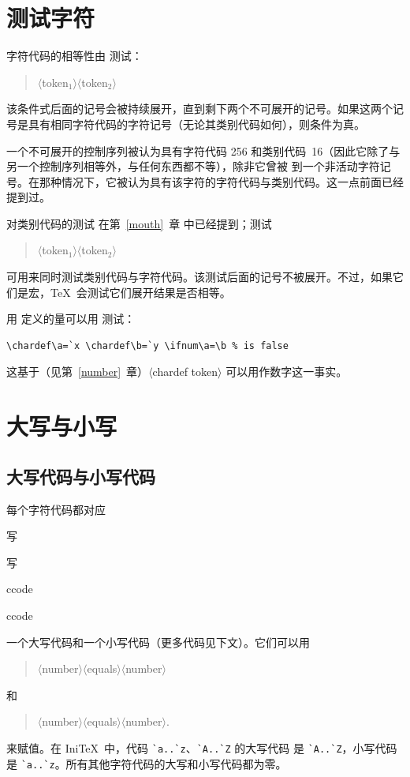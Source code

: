 \documentclass[a4paper]{rapport3}
\makeatletter
\def\gr#1{$\langle$#1$\rangle$}\def\key#1{{\tt#1}}
\def\IniTeX{Ini\TeX}\def\LamsTeX{LAMS\TeX}\def\VirTeX{Vir\TeX}
\newenvironment{disp}{\begin{quotation}}{\end{quotation}}
\newenvironment{Disp}{\begin{quotation}}{\end{quotation}}
\def\gram#1{\gr{#1}}%
\def\term#1\par{\index{#1}}
\def\cstoidx#1\par{\index{#1@\cs{#1}}}
\makeatother
\begin{document}
\section{测试字符}

字符代码的相等性由  测试：
\begin{disp}\gr{token$_1$}\gr{token$_2$}\end{disp}
该条件式后面的记号会被持续展开，直到剩下两个不可展开的记号。如果这两个记号是具有相同字符代码的字符记号（无论其类别代码如何），则条件为真。

一个不可展开的控制序列被认为具有字符代码 256 和类别代码~16（因此它除了与另一个控制序列相等外，与任何东西都不等），除非它曾被  到一个非活动字符记号。在那种情况下，它被认为具有该字符的字符代码与类别代码。这一点前面已经提到过。

对类别代码的测试  在第~\ref{mouth}~章 中已经提到；测试
\begin{disp}\gr{token$_1$}\gr{token$_2$}\end{disp}
可用来同时测试类别代码与字符代码。该测试后面的记号不被展开。不过，如果它们是宏，\TeX\ 会测试它们展开结果是否相等。

用  定义的量可以用  测试：
\begin{verbatim}
\chardef\a=`x \chardef\b=`y \ifnum\a=\b % is false 
\end{verbatim}
这基于（见第~\ref{number}~章）\gr{chardef token} 可以用作数字这一事实。

\section{大写与小写}

\subsection{大写代码与小写代码}
\label{uc/lc}

每个字符代码都对应
\term 大写\par\term 小写\par
\cstoidx lccode\par\cstoidx uccode\par
一个大写代码和一个小写代码（更多代码见下文）。它们可以用
\begin{Disp}\gram{number}\gr{equals}\gram{number}\end{Disp}
和
\begin{Disp}\gram{number}\gr{equals}\gram{number}.\end{Disp}
来赋值。在 \IniTeX\ 中，代码 \verb-`a..`z-、\verb-`A..`Z- 的大写代码
\label{ini:uclc}
是 \verb-`A..`Z-，小写代码是 \verb-`a..`z-。所有其他字符代码的大写和小写代码都为零。
\end{document}
